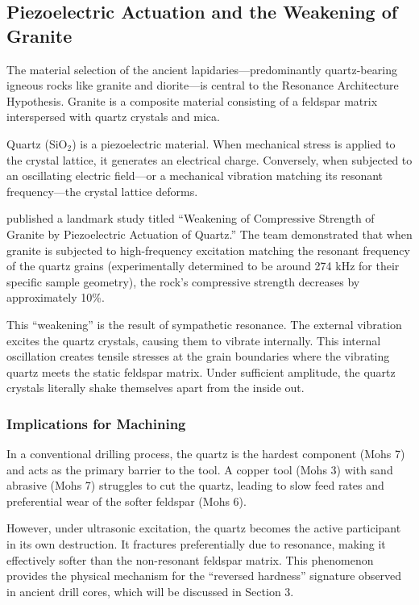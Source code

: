 \documentclass[11pt]{article}
\begin{document}
\subsection{Piezoelectric Actuation and the Weakening of Granite}

The material selection of the ancient lapidaries---predominantly quartz-bearing igneous rocks like granite and diorite---is central to the Resonance Architecture Hypothesis. Granite is a composite material consisting of a feldspar matrix interspersed with quartz crystals and mica.

Quartz (SiO$_2$) is a piezoelectric material. When mechanical stress is applied to the crystal lattice, it generates an electrical charge. Conversely, when subjected to an oscillating electric field---or a mechanical vibration matching its resonant frequency---the crystal lattice deforms.

\citet{Saksala2023} published a landmark study titled ``Weakening of Compressive Strength of Granite by Piezoelectric Actuation of Quartz.'' The team demonstrated that when granite is subjected to high-frequency excitation matching the resonant frequency of the quartz grains (experimentally determined to be around 274 kHz for their specific sample geometry), the rock's compressive strength decreases by approximately 10\%.

This ``weakening'' is the result of sympathetic resonance. The external vibration excites the quartz crystals, causing them to vibrate internally. This internal oscillation creates tensile stresses at the grain boundaries where the vibrating quartz meets the static feldspar matrix. Under sufficient amplitude, the quartz crystals literally shake themselves apart from the inside out.

\subsubsection{Implications for Machining}

In a conventional drilling process, the quartz is the hardest component (Mohs 7) and acts as the primary barrier to the tool. A copper tool (Mohs 3) with sand abrasive (Mohs 7) struggles to cut the quartz, leading to slow feed rates and preferential wear of the softer feldspar (Mohs 6).

However, under ultrasonic excitation, the quartz becomes the active participant in its own destruction. It fractures preferentially due to resonance, making it effectively softer than the non-resonant feldspar matrix. This phenomenon provides the physical mechanism for the ``reversed hardness'' signature observed in ancient drill cores, which will be discussed in Section 3.
\end{document}
